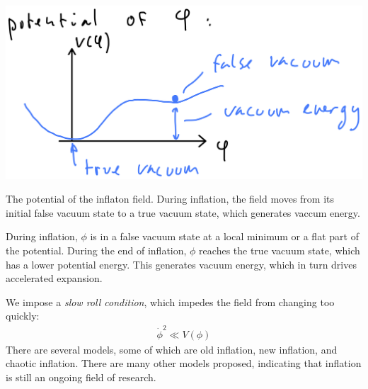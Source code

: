 \begin{marginfigure}
	\centering
	\includegraphics[width=\textwidth]{img/ch-02/false-vacuum.png}
	\caption{The potential of the inflaton field. During inflation, the field moves from its initial false vacuum state to a true vacuum state, which generates vaccum energy.}
	\label{fig:false-vacuum}
\end{marginfigure}

During inflation, $\phi$ is in a false vacuum state at a local minimum  or a flat part of the potential. During the end of inflation, $\phi$ reaches the true vacuum state, which has a lower potential energy. This generates vacuum energy, which in turn drives accelerated expansion.

We impose a \emph{slow roll condition}, which impedes the field from changing too quickly:
\begin{align*}
	\dot{\phi}^2 \ll V(\phi)
\end{align*}
There are several models, some of which are old inflation, new inflation, and chaotic inflation. There are many other models proposed, indicating that inflation is still an ongoing field of research.



